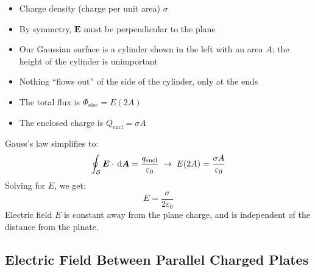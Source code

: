 \begin{itemize}[itemsep=6pt]
\item Charge density (charge per unit area) $\sigma$
\item By symmetry, $\bm E$ must be perpendicular to the plane
\item Our Gaussian surface is a cylinder shown in the left with an area
  $A$; the height of the cylinder is unimportant
\item Nothing ``flows out'' of the side of the cylinder, only at the ends
\item The total flux is $\Phi_\text{elec}=E(2A)$
\item The enclosed charge is $Q_\text{encl}=\sigma A$
\end{itemize}
  
Gauss's law simplifies to:
\begin{equation}
  \oint_{\mathcal S}\bm E\cdot\dl{\bm A}=\frac{q_\text{encl}}{\varepsilon_0}
  \;\rightarrow\;
  E(2A)=\frac{\sigma A}{\varepsilon_0}
\end{equation}
Solving for $E$, we get:
\begin{equation}
  \boxed{
    E=\frac\sigma{2\varepsilon_0}
  }
\end{equation}
Electric field $E$ is constant away from the plane charge, and is independent
of the distance from the plnate.
  




\subsection{Electric Field Between Parallel Charged Plates}
\begin{figure}[ht]
  \centering
\end{figure}

